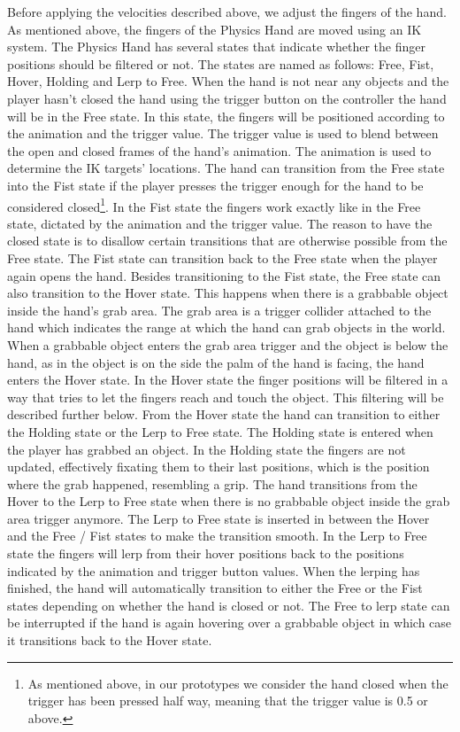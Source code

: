 Before applying the velocities described above, we adjust the fingers of the hand. As mentioned above, the fingers of the Physics Hand are moved using an IK system. The Physics Hand has several states that indicate whether the finger positions should be filtered or not. The states are named as follows: Free, Fist, Hover, Holding and Lerp to Free. When the hand is not near any objects and the player hasn't closed the hand using the trigger button on the controller the hand will be in the Free state. In this state, the fingers will be positioned according to the animation and the trigger value. The trigger value is used to blend between the open and closed frames of the hand's animation. The animation is used to determine the IK targets' locations. The hand can transition from the Free state into the Fist state if the player presses the trigger enough for the hand to be considered closed\footnote{As mentioned above, in our prototypes we consider the hand closed when the trigger has been pressed half way, meaning that the trigger value is 0.5 or above.}. In the Fist state the fingers work exactly like in the Free state, dictated by the animation and the trigger value. The reason to have the closed state is to disallow certain transitions that are otherwise possible from the Free state. The Fist state can transition back to the Free state when the player again opens the hand. Besides transitioning to the Fist state, the Free state can also transition to the Hover state. This happens when there is a grabbable object inside the hand's grab area. The grab area is a trigger collider attached to the hand which indicates the range at which the hand can grab objects in the world. When a grabbable object enters the grab area trigger and the object is below the hand, as in the object is on the side the palm of the hand is facing, the hand enters the Hover state. In the Hover state the finger positions will be filtered in a way that tries to let the fingers reach and touch the object. This filtering will be described further below. From the Hover state the hand can transition to either the Holding state or the Lerp to Free state. The Holding state is entered when the player has grabbed an object. In the Holding state the fingers are not updated, effectively fixating them to their last positions, which is the position where the grab happened, resembling  a grip. The hand transitions from the Hover to the Lerp to Free state when there is no grabbable object inside the grab area trigger anymore. The Lerp to Free state is inserted in between the Hover and the Free / Fist states to make the transition smooth. In the Lerp to Free state the fingers will lerp from their hover positions back to the positions indicated by the animation and trigger button values. When the lerping has finished, the hand will automatically transition to either the Free or the Fist states depending on whether the hand is closed or not. The Free to lerp state can be interrupted if the hand is again hovering over a grabbable object in which case it transitions back to the Hover state.

